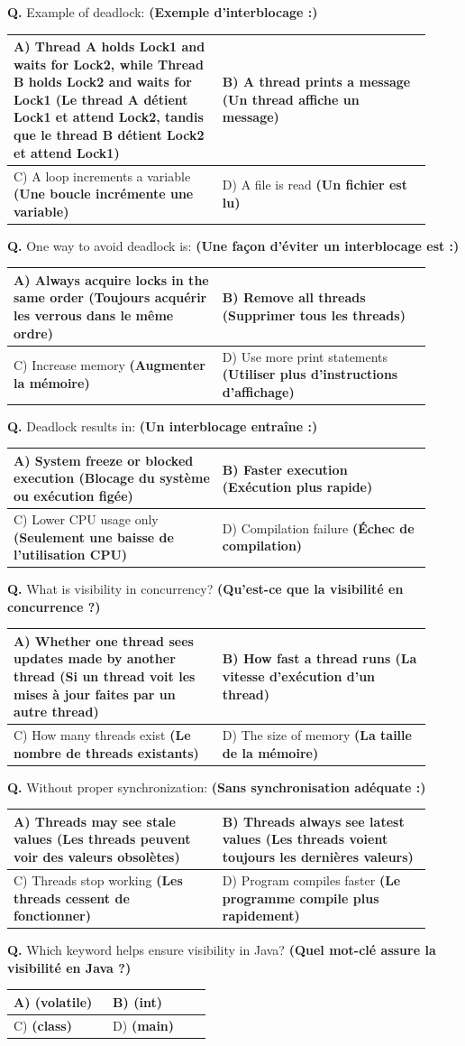 \documentclass[11pt,a4paper]{article}
\newcounter{qnum}
\newcommand{\Q}{%
	\stepcounter{qnum}%
	\noindent\textbf{Q\theqnum. }%
}
\DeclareRobustCommand{\code}[1]{\texttt{\detokenize{#1}}}
\newcommand{\choices}[4]{%
	\setlength{\tabcolsep}{4pt}%
	\renewcommand{\arraystretch}{1.15}%
	\begin{tabular}{|p{0.46\linewidth}|p{0.46\linewidth}|}
		\hline
		A) #1 & B) #2 \\ \hline
		C) #3 & D) #4 \\ \hline
	\end{tabular}%
}
\begin{document}
\Q Example of deadlock: \textbf{(Exemple d’interblocage :) }

\choices
{Thread A holds Lock1 and waits for Lock2, while Thread B holds Lock2 and waits for Lock1 \textbf{(Le thread A détient Lock1 et attend Lock2, tandis que le thread B détient Lock2 et attend Lock1)}}
{A thread prints a message \textbf{(Un thread affiche un message)}}
{A loop increments a variable \textbf{(Une boucle incrémente une variable)}}
{A file is read \textbf{(Un fichier est lu)}}

\Q One way to avoid deadlock is: \textbf{(Une façon d’éviter un interblocage est :) }

\choices
{Always acquire locks in the same order \textbf{(Toujours acquérir les verrous dans le même ordre)}}
{Remove all threads \textbf{(Supprimer tous les threads)}}
{Increase memory \textbf{(Augmenter la mémoire)}}
{Use more print statements \textbf{(Utiliser plus d’instructions d’affichage)}}

\Q Deadlock results in: \textbf{(Un interblocage entraîne :) }

\choices
{System freeze or blocked execution \textbf{(Blocage du système ou exécution figée)}}
{Faster execution \textbf{(Exécution plus rapide)}}
{Lower CPU usage only \textbf{(Seulement une baisse de l’utilisation CPU)}}
{Compilation failure \textbf{(Échec de compilation)}}

\Q What is visibility in concurrency? \textbf{(Qu’est-ce que la visibilité en concurrence ?) }

\choices
{Whether one thread sees updates made by another thread \textbf{(Si un thread voit les mises à jour faites par un autre thread)}}
{How fast a thread runs \textbf{(La vitesse d’exécution d’un thread)}}
{How many threads exist \textbf{(Le nombre de threads existants)}}
{The size of memory \textbf{(La taille de la mémoire)}}

\Q Without proper synchronization: \textbf{(Sans synchronisation adéquate :) }

\choices
{Threads may see stale values \textbf{(Les threads peuvent voir des valeurs obsolètes)}}
{Threads always see latest values \textbf{(Les threads voient toujours les dernières valeurs)}}
{Threads stop working \textbf{(Les threads cessent de fonctionner)}}
{Program compiles faster \textbf{(Le programme compile plus rapidement)}}

\Q Which keyword helps ensure visibility in Java? \textbf{(Quel mot-clé assure la visibilité en Java ?) }

\choices
{\code{volatile} \textbf{(volatile)}}
{\code{int} \textbf{(int)}}
{\code{class} \textbf{(class)}}
{\code{main} \textbf{(main)}}
\end{document}
